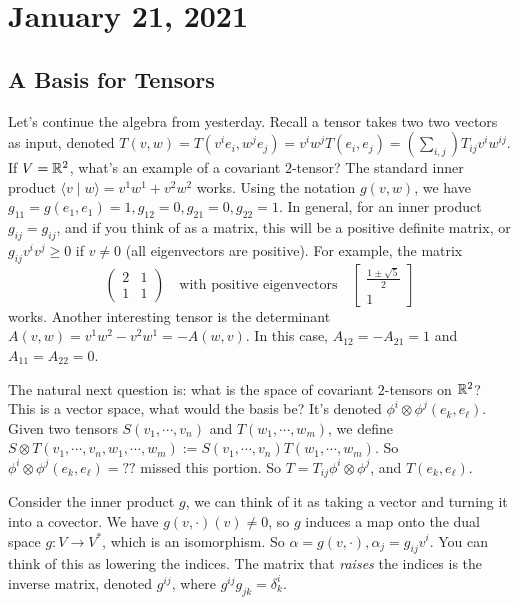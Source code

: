 \section{January 21, 2021}

\subsection{A Basis for Tensors}
Let's continue the algebra from yesterday. Recall a tensor takes two two vectors as input, denoted $T(v,w)=T(v^i e_i , w^j e_j )=v ^i  w ^j T (e_i , e_j )=\left( \sum _{i,j} \right) T_{ij}v^i w^{ij}$. If $V=\mathbb{R}^2$, what's an example of a covariant $2$-tensor? The standard inner product $\langle v \mid w \rangle =v^1w^1+v^2w^2$ works. Using the notation $g(v,w)$, we have $g_{11}=g(e_1,e_1)=1, g_{12}=0, g_{21}=0, g_{22}=1$. In general, for an inner product $g_{ij}=g_{ij}$, and if you think of as a matrix, this will be a positive definite matrix, or $g_{ij}v^i v^j \geq 0$ if $v\neq 0$ (all eigenvectors are positive). For example, the matrix \[
\begin{pmatrix}
    2 & 1 \\ 1 & 1 
\end{pmatrix} \quad \text{with positive eigenvectors} \quad
\begin{bmatrix}
    \frac{1\pm \sqrt{5} }{2}\\ 1
\end{bmatrix}
\] works. Another interesting tensor is the determinant $A(v,w)=v^1w^2-v^2w^1=-A(w,v)$. In this case, $A_{12}=-A_{21}=1$ and $A_{11}=A_{22}=0$.

The natural next question is: what is the space of covariant $2$-tensors on $\mathbb{R}^2$? This is a vector space, what would the basis be? It's denoted $\phi^i \otimes \phi ^j (e_k, e_{\ell})$. Given two tensors $S(v_1,\cdots ,v_n )$ and $T(w_1,\cdots ,w_m)$, we define $S \otimes T (v_1,\cdots ,v_n , w_1,\cdots ,w_m):= S(v_1,\cdots ,v_n )T(w_1,\cdots ,w_m)$. So $\phi ^i \otimes \phi ^j  (e_k, e_{\ell})=??$ {\color{red} missed this portion}. So $T=T_{ij}\phi ^i  \otimes \phi ^j $, and $T(e_k,e_{\ell})$.

Consider the inner product $g$, we can think of it as taking a vector and turning it into a covector. We have $g(v,\cdot )(v)\neq 0$, so $g$ induces a map onto the dual space $g \colon V \to V^*$, which is an isomorphism. So $\alpha =g(v,\cdot ), \alpha _j =g_{ij}v^i $. You can think of this as lowering the indices. The matrix that \emph{raises} the indices is the inverse matrix, denoted $g^{ij}$, where $g^{ij}g_{jk}=\delta^i _k$.

